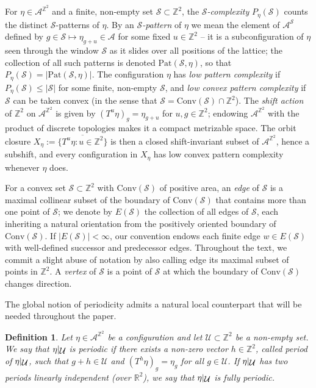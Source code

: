 \documentclass[12pt]{amsart}
\numberwithin{equation}{section}
\newtheorem{definition}[theorem]{Definition}
\newcommand{\bb}[1]{\mathbb{#1}}
\newcommand{\sob}[1]{\ensuremath{{\mathbin |}\raise-.4ex\hbox{$#1$}}}
\begin{document}
For $\eta\in\mathcal{A}^{\mathbb{Z}^2}$ and a finite, non-empty set $\mathcal S\subset\mathbb Z^2$, the \emph{$\mathcal S$-complexity} $P_\eta(\mathcal S)$ counts the distinct $\mathcal S$-patterns of $\eta$. By an \emph{$\mathcal{S}$-pattern} of $\eta$ we mean the element of $\mathcal{A}^{\mathcal{S}}$ defined by $g\in\mathcal{S}\mapsto\eta_{g+u}\in\mathcal{A}$ for some fixed $u\in\mathbb{Z}^2$ -- it is a subconfiguration of $\eta$ seen through the window $\mathcal{S}$ as it slides over all positions
of the lattice; the collection of all such patterns is denoted $\mathrm{Pat}(\mathcal{S},\eta)$, so that $P_\eta(\mathcal{S})=|\mathrm{Pat}(\mathcal{S},\eta)|$. The configuration $\eta$ has \emph{low pattern complexity} if $P_\eta(\mathcal S)\le|\mathcal S|$ for some finite, non-empty $\mathcal S$, and \emph{low convex pattern complexity} if $\mathcal S$ can be taken convex (in the sense that $\mathcal{S} = \mathrm{Conv}(\mathcal S)\cap\mathbb Z^2$). The \emph{shift action} of $\mathbb Z^2$ on $ \mathcal A^{\mathbb Z^2}$ is given by $ (T^u \eta)_g = \eta_{g+u} $ for $ u, g \in \mathbb Z^2 $; endowing $ \mathcal A^{\mathbb Z^2} $ with the product of discrete topologies makes it a compact metrizable space.
The orbit closure $X_\eta:=\overline{\{T^u\eta:u\in\mathbb Z^2\}}$ is then a closed shift-invariant subset of $\mathcal A^{\mathbb Z^2}$, hence a subshift, and every configuration in $X_\eta$ has low convex pattern complexity whenever $\eta$ does.

For a convex set $ \mathcal S \subset \mathbb Z^2 $ with $ \mathrm{Conv}(\mathcal S) $ of positive area, an \emph{edge} of $ \mathcal S $ is a maximal collinear subset of the boundary of $\mathrm{Conv}(\mathcal S)$ that contains more than one point of $ \mathcal S $; we denote by $E(\mathcal S)$ the collection of all edges of $\mathcal S$, each inheriting a natural orientation from the positively oriented boundary of $ \mathrm{Conv}(\mathcal S)$. If $|E(\mathcal{S})| < \infty$, our convention endows each finite edge $w \in E(\mathcal{S})$ with well-defined successor and predecessor edges. Throughout the text, we commit a slight abuse of notation by also calling edge its maximal subset of points in $ \mathbb Z^2 $. A \emph{vertex} of $ \mathcal S $ is a point of $ \mathcal S $ at which the boundary of $ \mathrm{Conv}(\mathcal S)$ changes direction. 

The global notion of periodicity admits a natural local counterpart that will be needed throughout the paper.

\begin{definition}
Let $\eta \in \mathcal{A}^{\bb{Z}^2}$ be a configuration and let $\mathcal{U} \subset \bb{Z}^2$ be a non-empty set. We say that \(\eta\sob{\mathcal{U}}\) is \emph{periodic} if there exists a non-zero vector $h \in \bb{Z}^2$, called \emph{period of \(\eta\sob{\mathcal{U}}\)}, such that $g+h \in \mathcal{U}$ and $(T^{h}\eta)_{g} = \eta_{g}$ for all $g \in \mathcal{U}$.
If \(\eta\sob{\mathcal{U}}\) has two periods linearly independent (over $\bb{R}^2$), we say that \(\eta\sob{\mathcal{U}}\) is \emph{fully peri\-odic}.	
\end{definition}
\end{document}
